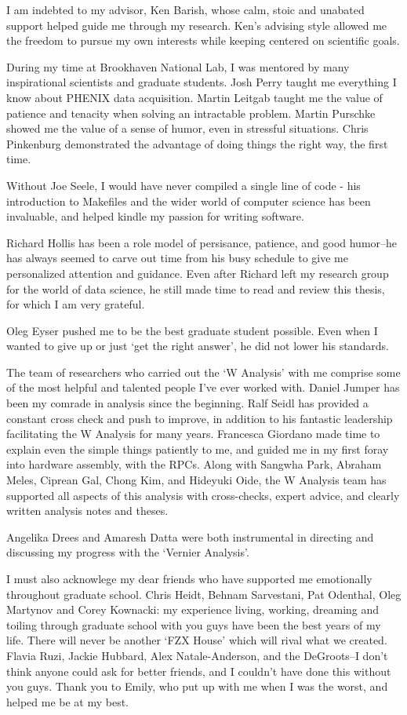I am indebted to my advisor, Ken Barish, whose calm, stoic and unabated support
helped guide me through my research. Ken's advising style allowed me the
freedom to pursue my own interests while keeping centered on scientific goals.

During my time at Brookhaven National Lab, I was mentored by many inspirational
scientists and graduate students. Josh Perry taught me everything I know about
PHENIX data acquisition. Martin Leitgab taught me the value of patience and
tenacity when solving an intractable problem. Martin Purschke showed me the
value of a sense of humor, even in stressful situations. Chris Pinkenburg
demonstrated the advantage of doing things the right way, the first time.

Without Joe Seele, I would have never compiled a single line of code - his
introduction to Makefiles and the wider world of computer science has been
invaluable, and helped kindle my passion for writing software.

Richard Hollis has been a role model of persisance, patience, and good
humor--he has always seemed to carve out time from his busy schedule to give me
personalized attention and guidance. Even after Richard left my research group
for the world of data science, he still made time to read and review this
thesis, for which I am very grateful.

Oleg Eyser pushed me to be the best graduate student possible. Even when I
wanted to give up or just `get the right answer', he did not lower his
standards.

The team of researchers who carried out the `W Analysis' with me comprise some
of the most helpful and talented people I've ever worked with. Daniel Jumper
has been my comrade in analysis since the beginning. Ralf Seidl has provided a
constant cross check and push to improve, in addition to his fantastic
leadership facilitating the W Analysis for many  years. Francesca Giordano made
time to explain even the simple things patiently to me, and guided me in my
first foray into hardware assembly, with the RPCs. Along with Sangwha Park,
Abraham Meles, Ciprean Gal, Chong Kim, and Hideyuki Oide, the W Analysis team
has supported all aspects of this analysis with cross-checks, expert advice,
and clearly written analysis notes and theses.

Angelika Drees and Amaresh Datta were both instrumental in directing and
discussing my progress with the `Vernier Analysis'.

I must also acknowlege my dear friends who have supported me emotionally
throughout graduate school. Chris Heidt, Behnam Sarvestani, Pat Odenthal, Oleg
Martynov and Corey Kownacki: my experience living, working, dreaming and
toiling through graduate school with you guys have been the best years of my
life. There will never be another `FZX House' which will rival what we created.
Flavia Ruzi, Jackie Hubbard, Alex Natale-Anderson, and the DeGroots--I don't
think anyone could ask for better friends, and I couldn't have done this
without you guys.  Thank you to Emily, who put up with me when I was the worst,
and helped me be at my best.  

